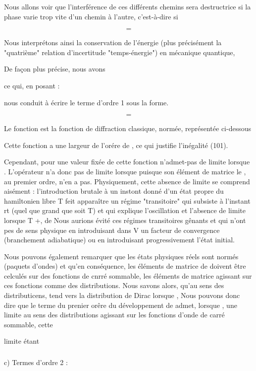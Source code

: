 %
 
Nous allons voir que l'interférence de ces différents
chemins sera destructrice si la phase varie trop vite d'un chemin
à l'autre, c'est-à-dire si

\[
\tag{101}=
\]

Nous interprétons ainsi la conservation de l'énergie
(plus précisément la "quatrième" relation d'incertitude "temps-énergie") en mécanique quantique,

De façon plus précise, nous avons

ce qui, en posant :

nous conduit à écrire le terme d'ordre 1 sous la forme.

\[
\tag{103}=
\]

Le fonction  est la fonction de diffraction classique, normée, représentée ci-dessous

%
Cette fonction a une largeur de l'orére de , ce qui justifie
l'inégalité (101).

Cependant, pour une valeur fixée de cette fonction
n'admet-pas de limite lorsque . L'opérateur  n'a donc
pas de limite lorsque  puisque son élément de matrice
le , au premier ordre, n'en a pas. Physiquement,
cette absence de limite se comprend aisément : l'introduction brutale
à un instont donné  d'un état propre  du hamiltonien libre T
feit apparaître un régime "transitoire" qui subsiste à l'instant rt (quel
que grand que soit T) et qui explique l'oscillation et l'absence de limite
lorsque T +, de  Nous aurions évité ces
régimes transitoires gênants et qui n'ont pes de sens physique en introduisant
dans V un facteur de convergence (branchement adiabatique) ou en
introduisant progressivement l'état initial.

Nous pouvons également remarquer que les états physiques réels
sont normés (paquets d'ondes) et qu'en conséquence, les éléments de matrice
de  doivent être celculés sur des fonctions de cnrré sommable,
les éléments de matrice  agissant sur ces fonctions
comme des distributions. Nous savons alors, qu'au sens des distributicens,
 tend vers la distribution de Dirac  lorsque
, Nous pouvons donc dire que le terme du prenier orêre du développement
de  admet, lorsque  , une limite au sens des
distributions agissant sur les fonctions d'onde de carré sommable, cette

limite étant


\subsubsection{}%
c) Termes d'ordre 2 :

